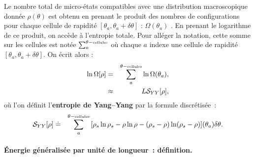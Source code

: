 
Le nombre total de micro-états compatibles avec une distribution macroscopique donnée $\rho(\theta)$ est obtenu en prenant le produit des nombres de configurations pour chaque cellule de rapidité $[\theta_a, \theta_a + \delta \theta]$ : $ \Omega(\theta_a)$ .
En prenant le logarithme de ce produit, on accède à l'entropie totale. Pour alléger la notation, cette somme sur les cellules est notée
\(
	\sum_a^{\theta-\mbox{\tiny cellules}}	
\)
où chaque $a$ indexe une cellule de rapidité $[\theta_a, \theta_a + \delta\theta]$.
On écrit alors :
\begin{eqnarray}
    \ln \Omega[\rho] & = & \sum_a^{\theta-\mbox{\tiny cellules}} \ln \Omega(\theta_a), \\
    & \approx &   L\mathcal{S}_{YY} [ \rho ] , 	
\end{eqnarray}
où l’on définit l’\textbf{entropie de Yang–Yang} par la formule discrétisée :
\begin{eqnarray}
    \mathcal{S}_{YY}[\rho] & \doteq & \sum_a^{\theta-\mbox{\tiny cellules}} \, [ \rho_s\ln \rho_s - \rho \ln \rho - ( \rho_s - \rho ) \ln ( \rho_s - \rho ) ] (\theta_a) \delta \theta .
\end{eqnarray}



\paragraph{Énergie généralisée par unité de longueur : définition.}

